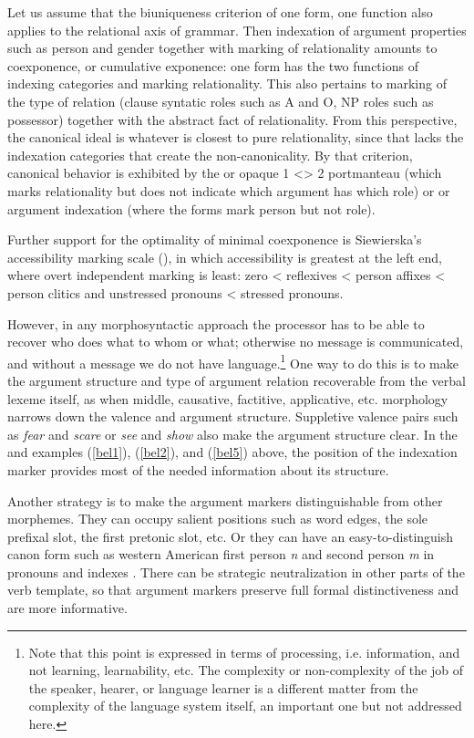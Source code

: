 \documentclass[output=paper,hidelinks]{langscibook}
\begin{document}
Let us assume that the biuniqueness criterion of one form, one function also applies to the relational axis of grammar.  Then indexation of argument properties such as person and gender together with marking of relationality amounts to coexponence, or cumulative exponence:  one form has the two functions of indexing categories and marking relationality.  This also pertains to marking of the type of relation (clause syntatic roles such as A and O, NP roles such as possessor) together with the abstract fact of relationality.  From this perspective, the canonical ideal is whatever is closest to pure relationality, since that lacks the indexation categories that create the non-canonicality.  By that criterion, canonical behavior is exhibited by the  or  opaque 1 <> 2 portmanteau (which marks relationality but does not indicate which argument has which role) or  or  argument indexation (where the forms mark person but not role). 

Further support for the optimality of minimal coexponence is Siewierska's accessibility marking scale (\citeyear[176]{Siewierska2004}), in which accessibility is greatest at the left end, where overt independent marking is least:     zero < reflexives < person affixes < person clitics and unstressed pronouns < stressed pronouns.  	

However, in any morphosyntactic approach the processor has to be able to recover who does what to whom or what; otherwise no message is communicated, and without a message we do not have language.\footnote{Note that this point is expressed in terms of processing, i.e. information, and not learning, learnability, etc.  The complexity or non-complexity of the job of the speaker, hearer, or language learner is a different matter from the complexity of the language system itself, an important one but not addressed here.}   One way to do this is to make the argument structure and type of argument relation recoverable from the verbal lexeme itself, as when middle, causative, factitive, applicative, etc. morphology narrows down the valence and argument structure.  Suppletive valence pairs such as \textit{fear} and \textit{scare} or \textit{see} and \textit{show} also make the argument structure clear.  In the  and  examples (\ref{bel1}), (\ref{bel2}), and (\ref{bel5}) above, the position of the indexation marker provides most of the needed information about its structure.

Another strategy is to make the argument markers distinguishable from other morphemes.  They can occupy salient positions such as word edges, the sole prefixal slot, the first pretonic slot, etc.  Or they can have an easy-to-distinguish canon form such as western American first person \textit{n} and second person \textit{m} in pronouns and indexes \citep{Nichols1996,Nichols2013}.  There can be strategic neutralization in other parts of the verb template, so that argument markers preserve full formal distinctiveness and are more informative.
\end{document}
